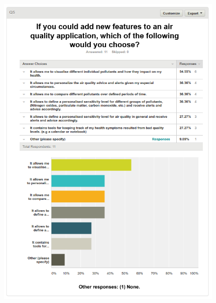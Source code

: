 \begin{figure}[H]
\begin{adjustbox}{width=1\textwidth,center=\textwidth}
  \centering
  \includegraphics[scale=1]{surveys/q5.png}
\end{adjustbox}
\end{figure}
